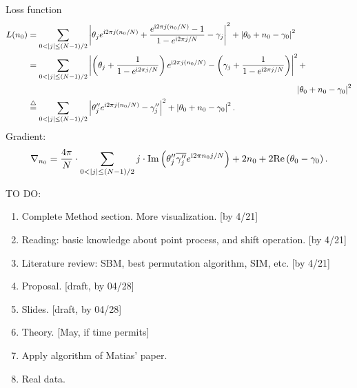 \noindent
Loss function
\begin{equation*}
		\begin{aligned}\label{eq:aligned distance}
		L(n_0)&=
		\sum_{0<|j|\leq (N-1)/2}
		\left| \theta_{j}e^{\complexunit 2\pi j (n_0/N)}+
		\frac{e^{\complexunit{}2\pi j (n_0/N)}-1}{1-e^{\complexunit{}2\pi j /N}}
		-\gamma_{j} \right|^2
		+ \left| \theta_0+n_0-\gamma_0 \right|^2
		\\
		&=
		\sum_{0<|j|\leq (N-1)/2}
		\left| \left( \theta_{j}+ \frac{1}{1-e^{\complexunit{}2\pi j /N}} \right) e^{\complexunit{}2\pi j (n_0/N)} 
		- \left( \gamma_{j}+\frac{1}{1-e^{\complexunit{}2\pi j /N}} \right)  \right|^2 
		+\\
		&\hspace{11cm} \left| \theta_0+n_0-\gamma_0 \right|^2
		\\
		&\overset{\triangle}{=}
		\sum_{0<|j|\leq (N-1)/2}\left| \theta_{j}'' e^{\complexunit{}2\pi j (n_0/N)} - {\gamma_{j}''}  \right|^2
		+ \left| \theta_0+n_0-\gamma_0 \right|^2
		.
\end{aligned}
\end{equation*}
\noindent
Gradient:
	\begin{equation}
		\begin{split}
		\nabla_{n_0} = \frac{4\pi}{N}\cdot 
		\sum_{0<|j|\leq (N-1)/2} j\cdot 
		\text{Im} \left( {\theta_j''}\overline{{\gamma_j''}}e^{\complexunit2\pi n_0 j/N} \right) 
		+ 2n_0+2 \text{Re}\left( \theta_0-\gamma_0 \right) .
		\end{split}
		\end{equation}





TO DO:
\begin{enumerate}
	\item Complete Method section. More visualization. [by 4/21]
	\item Reading: basic knowledge about point process, and shift operation. [by 4/21] %
	\item Literature review: SBM, best permutation algorithm, SIM, etc. [by 4/21]
	\item Proposal. [draft, by 04/28]
	\item Slides. [draft, by 04/28]
	\item Theory. [May, if time permits]
	\item Apply algorithm of Matias' paper.
	\item Real data. 
	
\end{enumerate}




